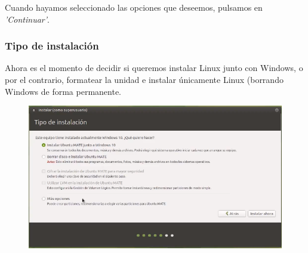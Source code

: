     Cuando hayamos seleccionado las opciones que deseemos, pulsamos en \textit{'Continuar'}.
    
\subsubsection{Tipo de instalación}
Ahora es el momento de decidir si queremos instalar Linux junto con Windows, o por el contrario, formatear la unidad e instalar únicamente Linux (borrando Windows de forma permanente.
\begin{figure}[H]
        \centering
        \includegraphics[width= 0.7 \textwidth]{Media/umate4.png}
\end{figure}

